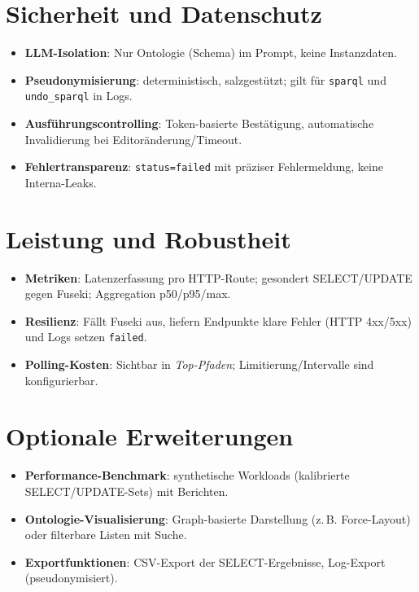 \section{Sicherheit und Datenschutz}
\begin{itemize}
  \item \textbf{LLM-Isolation}: Nur Ontologie (Schema) im Prompt, keine Instanzdaten.
  \item \textbf{Pseudonymisierung}: deterministisch, salzgestützt; gilt für \texttt{sparql} und \texttt{undo\_sparql} in Logs.
  \item \textbf{Ausführungscontrolling}: Token-basierte Bestätigung, automatische Invalidierung bei Editoränderung/Timeout.
  \item \textbf{Fehlertransparenz}: \texttt{status=failed} mit präziser Fehlermeldung, keine Interna-Leaks.
\end{itemize}

\section{Leistung und Robustheit}
\begin{itemize}
  \item \textbf{Metriken}: Latenzerfassung pro HTTP-Route; gesondert SELECT/UPDATE gegen Fuseki; Aggregation p50/p95/max.
  \item \textbf{Resilienz}: Fällt Fuseki aus, liefern Endpunkte klare Fehler (HTTP 4xx/5xx) und Logs setzen \texttt{failed}.
  \item \textbf{Polling-Kosten}: Sichtbar in \emph{Top-Pfaden}; Limitierung/Intervalle sind konfigurierbar.
\end{itemize}

\section{Optionale Erweiterungen}
\begin{itemize}
  \item \textbf{Performance-Benchmark}: synthetische Workloads (kalibrierte SELECT/UPDATE-Sets) mit Berichten.
  \item \textbf{Ontologie-Visualisierung}: Graph-basierte Darstellung (z.\,B. Force-Layout) oder filterbare Listen mit Suche.
  \item \textbf{Exportfunktionen}: CSV-Export der SELECT-Ergebnisse, Log-Export (pseudonymisiert).
\end{itemize}

